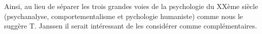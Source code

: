 Ainsi, au lieu de séparer les trois grandes voies de la psychologie du
XXème siècle (psychanalyse, comportementalisme et pychologie
humaniste) comme nous le suggère T. Janssen
\autocite[197]{van_eersel_cerveau} il serait intéressant de les
considérer comme complémentaires.








      


  
 	
 	
 	
 
       
   
 





      



 











   
 

  

  
  


   
   
   
   




















